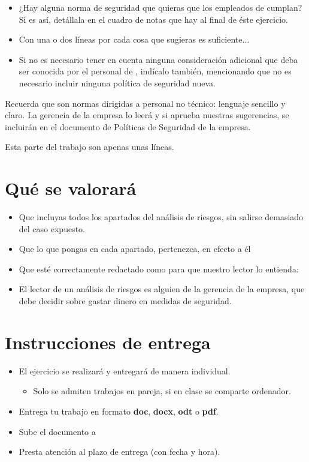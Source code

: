 \begin{itemize}
\item ¿Hay alguna norma de seguridad que quieras que los empleados de {\nombreempresa} cumplan? Si es así, detállala en  el cuadro de notas que hay al final de éste ejercicio.
  
\item Con una o dos líneas por cada cosa que sugieras es   suficiente...
  
\item Si no es necesario tener en cuenta ninguna consideración adicional que deba ser conocida por el personal  de {\nombreempresa}, indícalo también, mencionando que no es necesario incluir ninguna política de seguridad nueva.
\end{itemize}
Recuerda que son normas dirigidas a personal no técnico: lenguaje sencillo y claro. La gerencia de la empresa lo leerá y si aprueba nuestras sugerencias, se incluirán en el documento de Políticas de Seguridad de la empresa.

Esta parte del trabajo son apenas unas líneas.

\section{Qué se valorará}
\begin{itemize}
\item Que incluyas todos los apartados del análisis de riesgos, sin salirse demasiado del caso expuesto.
\item Que lo que pongas en cada apartado, pertenezca, en efecto a él
\item Que esté correctamente redactado como para que nuestro lector lo entienda:
\item El lector de un análisis de riesgos es alguien de la gerencia de la empresa, que debe decidir sobre gastar dinero en medidas de seguridad.
\end{itemize}

\section{Instrucciones de entrega}
\begin{itemize}
\item El ejercicio se realizará y entregará de manera individual.
  \begin{itemize}
  \item Solo se admiten trabajos en pareja, si en clase se comparte ordenador.
  \end{itemize}
\item Entrega tu trabajo en formato \textbf{doc}, \textbf{docx}, \textbf{odt} o \textbf{pdf}.
\item Sube el documento a 
\item Presta atención al plazo de entrega (con fecha y hora).
\end{itemize}

